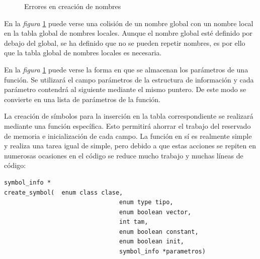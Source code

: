\documentclass[a4paper,10pt]{article}
\begin{document}
\begin{figure}[H]
  \centering
  \hspace{11mm}
  \caption{Errores en creación de nombres}
  \label{fig:part4}
\end{figure}
En la \emph{figura} \ref{fig:part4} puede verse una colisión de un nombre global con un nombre local en la tabla global de nombres locales. Aunque el nombre global esté definido por debajo del global, se ha definido que no se pueden repetir nombres, es por ello que la tabla global de nombres locales es necesaria. 

En la \emph{figura} \ref{fig:part4} puede verse la forma en que se almacenan los parámetros de una función. Se utilizará el campo parámetros de la estructura de información y cada parámetro contendrá al siguiente mediante el mismo puntero. De este modo se convierte en una lista de parámetros de la función.

La creación de símbolos para la inserción en la tabla correspondiente se realizará mediante una función específica. Esto permitirá ahorrar el trabajo del reservado de memoria e inicialización de cada campo. La función en sí es realmente simple y realiza una tarea igual de simple, pero debido a que estas acciones se repiten en numerosas ocasiones en el código se reduce mucho trabajo y muchas líneas de código:

\begin{lstlisting}
symbol_info *
create_symbol(	enum class clase,
								enum type tipo,
								enum boolean vector,
								int tam,
								enum boolean constant,
								enum boolean init,
								symbol_info *parametros)
\end{lstlisting}
\end{document}
